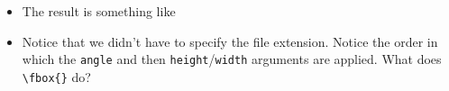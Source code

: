 \begin{itemize}
\item The result is something like 
  \begin{center}
  \end{center}

\item Notice that we didn't have to specify the file extension. Notice
  the order in which the \texttt{angle} and then
  \texttt{height}/\texttt{width} arguments are applied. What does
  \verb!\fbox{}! do?
    

\end{itemize}

